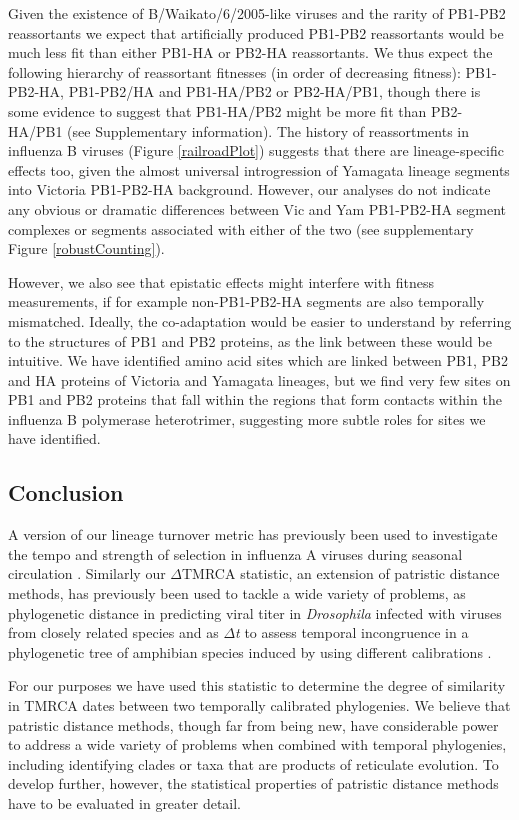 \documentclass[11pt,oneside,letterpaper]{article}
\begin{document}
Given the existence of B/Waikato/6/2005-like viruses and the rarity of PB1-PB2 reassortants we expect that artificially produced PB1-PB2 reassortants would be much less fit than either PB1-HA or PB2-HA reassortants.
We thus expect the following hierarchy of reassortant fitnesses (in order of decreasing fitness): PB1-PB2-HA, PB1-PB2/HA and PB1-HA/PB2 or PB2-HA/PB1, though there is some evidence to suggest that PB1-HA/PB2 might be more fit than PB2-HA/PB1 (see Supplementary information).
The history of reassortments in influenza B viruses (Figure \ref{railroadPlot}) suggests that there are lineage-specific effects too, given the almost universal introgression of Yamagata lineage segments into Victoria PB1-PB2-HA background.
However, our analyses do not indicate any obvious or dramatic differences between Vic and Yam PB1-PB2-HA segment complexes or segments associated with either of the two (see supplementary Figure \ref{robustCounting}).

However, we also see that epistatic effects might interfere with fitness measurements, if for example non-PB1-PB2-HA segments are also temporally mismatched.
Ideally, the co-adaptation would be easier to understand by referring to the structures of PB1 and PB2 proteins, as the link between these would be intuitive.
We have identified amino acid sites which are linked between PB1, PB2 and HA proteins of Victoria and Yamagata lineages, but we find very few sites on PB1 and PB2 proteins that fall within the regions that form contacts within the influenza B polymerase heterotrimer, suggesting more subtle roles for sites we have identified.

\subsection*{Conclusion}
A version of our lineage turnover metric has previously been used to investigate the tempo and strength of selection in influenza A viruses during seasonal circulation \cite{bedford2011}.
Similarly our $\Delta$TMRCA statistic, an extension of patristic distance methods, has previously been used to tackle a wide variety of problems, as phylogenetic distance in predicting viral titer in \textit{Drosophila} infected with viruses from closely related species \cite{longdon2011} and as \textit{$\Delta$t} to assess temporal incongruence in a phylogenetic tree of amphibian species induced by using different calibrations \cite{ruane2011}.

For our purposes we have used this statistic to determine the degree of similarity in TMRCA dates between two temporally calibrated phylogenies.
We believe that patristic distance methods, though far from being new, have considerable power to address a wide variety of problems when combined with temporal phylogenies, including identifying clades or taxa that are products of reticulate evolution.
To develop further, however, the statistical properties of patristic distance methods have to be evaluated in greater detail.
\end{document}
